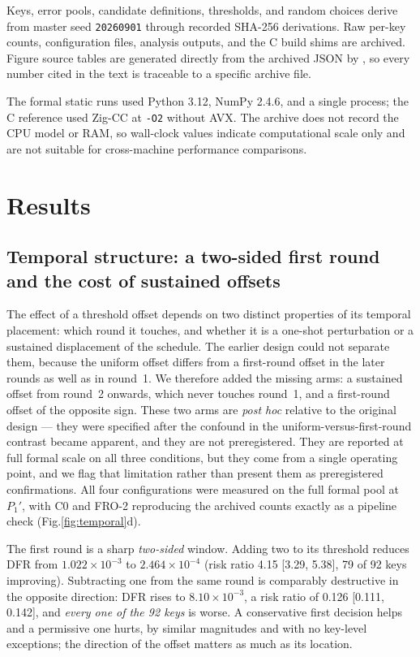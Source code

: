 \documentclass[lettersize,journal]{IEEEtran}
\begin{document}
Keys, error pools, candidate definitions, thresholds, and random choices derive from master seed \texttt{20260901} through recorded SHA-256 derivations. Raw per-key counts, configuration files, analysis outputs, and the C build shims are archived. Figure source tables are generated directly from the archived JSON by , so every number cited in the text is traceable to a specific archive file.

The formal static runs used Python 3.12, NumPy 2.4.6, and a single process; the C reference used Zig-CC at \texttt{-O2} without AVX. The archive does not record the CPU model or RAM, so wall-clock values indicate computational scale only and are not suitable for cross-machine performance comparisons.

\section{Results}\label{sec:results}

\subsection{Temporal structure: a two-sided first round and the cost of sustained offsets}\label{sec:temporal}

The effect of a threshold offset depends on two distinct properties of its temporal placement: which round it touches, and whether it is a one-shot perturbation or a sustained displacement of the schedule. The earlier design could not separate them, because the uniform offset differs from a first-round offset in the later rounds as well as in round~1. We therefore added the missing arms: a sustained offset from round~2 onwards, which never touches round~1, and a first-round offset of the opposite sign. These two arms are \emph{post hoc} relative to the original design --- they were specified after the confound in the uniform-versus-first-round contrast became apparent, and they are not preregistered. They are reported at full formal scale on all three conditions, but they come from a single operating point, and we flag that limitation rather than present them as preregistered confirmations. All four configurations were measured on the full formal pool at $P_1'$, with C0 and FRO-2 reproducing the archived counts exactly as a pipeline check (Fig.\ref{fig:temporal}d).

The first round is a sharp \emph{two-sided} window. Adding two to its threshold reduces DFR from $1.022\times10^{-3}$ to $2.464\times10^{-4}$ (risk ratio 4.15 [3.29, 5.38], 79 of 92 keys improving). Subtracting one from the same round is comparably destructive in the opposite direction: DFR rises to $8.10\times10^{-3}$, a risk ratio of 0.126 [0.111, 0.142], and \emph{every one of the 92 keys} is worse. A conservative first decision helps and a permissive one hurts, by similar magnitudes and with no key-level exceptions; the direction of the offset matters as much as its location.
\end{document}
